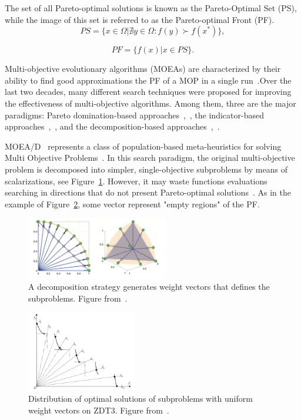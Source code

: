 \documentclass{IEEEtran}
\begin{document}
The set of all Pareto-optimal solutions is known as the Pareto-Optimal Set (PS), while the image of this set is referred to as the Pareto-optimal Front (PF).\\

\begin{equation}
PS = \{x \in \Omega | \nexists y \in \Omega : f(y) \succ f(x^*)  \},
\end{equation}

\begin{equation}
PF = \{f(x) | x \in PS \}.
\end{equation}

Multi-objective evolutionary algorithms (MOEAs) are characterized by their ability to find good approximations the PF of a MOP in a single run~\cite{zhou2011multiobjective}.Over the last two decades, many different search techniques were proposed for improving the effectiveness of multi-objective algorithms. Among them, three are the major paradigms: Pareto domination-based approaches~\cite{deb2002fast},~\cite{zitzler2001spea2}, the indicator-based approaches~\cite{beume2007sms},~\cite{zitzler2004indicator}, and the decomposition-based approaches~\cite{li2009multiobjective},~\cite{zhang2007moea}. 


MOEA/D~\cite{zhang2007moea} represents a class of population-based meta-heuristics for solving Multi Objective Problems~\cite{trivedi2017survey}. In this search paradigm, the original multi-objective problem is decomposed into simpler, single-objective subproblems by means of scalarizations, see Figure~\ref{fig1}.
However, it may waste functions evaluations searching in directions that do not present Pareto-optimal solutions~\cite{bezerra2015comparing}. As in the example of Figure~\ref{fig2}, some vector represent "empty regions" of the PF.
\begin{figure}[h]
	\centering
	\includegraphics[width=0.55\textwidth]{img/decomp2.png}
	\caption{A decomposition strategy generates weight vectors that defines the subproblems. Figure from~\cite{chugh2017handling}.}
	\label{fig1}
\end{figure}

\begin{figure}[h]
	\centering
	\includegraphics[width=0.43\textwidth]{img/harder_problems}
	\caption{Distribution of optimal solutions of subproblems with uniform weight vectors on ZDT3. Figure from~\cite{li2015use}.}
	\label{fig2}
\end{figure}
\end{document}
